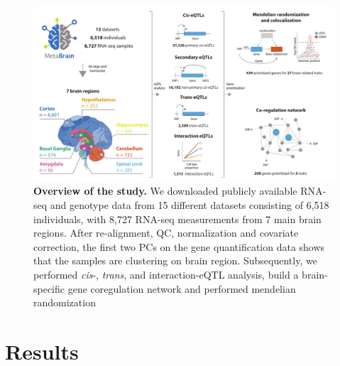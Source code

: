 \begin{figure}[h!]
	\includegraphics[width=\textwidth]{chapters/chapter5-brain-eqtls/img/2021-02-11-fig1-abstract_figure_v7.pdf}
	\caption{\textbf{Overview of the study.} We downloaded publicly available RNA-seq and genotype data from 15 different datasets consisting of 6,518 individuals, with 8,727 RNA-seq measurements from 7 main brain regions.  After re-alignment, QC, normalization and covariate correction, the first two PCs on the gene quantification data shows that the samples are clustering on brain region. Subsequently, we performed \emph{cis}-, \emph{trans}, and interaction-eQTL analysis, build a brain-specific gene coregulation network and performed mendelian randomization}
	\label{metabrain_fig1} 
\end{figure}


\section{Results}
